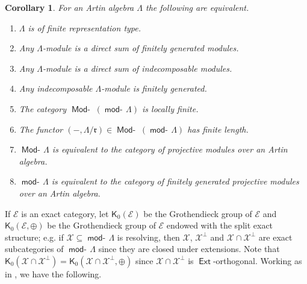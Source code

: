\documentclass[oneside, a4paper,reqno]{amsart}
\numberwithin{equation}{section}
\newtheorem{cor}[thm]{Corollary}
\theoremstyle{definition}
\begin{document}
\begin{cor} \cite{Auslander:large, Auslander:II, RT} For an Artin algebra $\Lambda$ the
following are equivalent.
\begin{enumerate}
\item $\Lambda$ is of finite representation type.
\item Any $\Lambda$-module is a direct sum of finitely generated
modules.
\item Any $\Lambda$-module is a direct sum of indecomposable
modules.
\item Any indecomposable $\Lambda$-module is finitely generated.
\item The category $\operatorname*{\mathsf{Mod}-\!}\,(\operatorname*{\mathsf{mod}-\!}\Lambda)$ is locally finite.
\item The functor $(-,\Lambda/\mathfrak{r}) \in \operatorname*{\mathsf{Mod}-\!}\,(\operatorname*{\mathsf{mod}-\!}\Lambda)$ has finite length.
\item $\operatorname*{\mathsf{Mod}-\!}\Lambda$ is equivalent to the category of projective modules over
an Artin algebra.
\item $\operatorname*{\mathsf{mod}-\!}\Lambda$ is equivalent to the category of finitely generated projective modules over
an Artin algebra.
\end{enumerate}
\end{cor}

If ${\mathscr E}$ is an exact category, let $\mathsf{K}_{0}({\mathscr E})$ be the
Grothendieck group of ${\mathscr E}$ and $\mathsf{K}_{0}({\mathscr E},\oplus)$ be the
Grothendieck group of ${\mathscr E}$ endowed with the split exact structure;
e.g. if ${\mathcal X} \subseteq \operatorname*{\mathsf{mod}-\!}\Lambda$ is resolving, then  ${\mathcal X}$,
${\mathcal X}^{\bot}$ and ${\mathcal X} \cap {\mathcal X}^{\bot}$ are exact subcategories of
$\operatorname*{\mathsf{mod}-\!}\Lambda$ since they are closed under extensions. Note that
$\mathsf{K}_{0}({\mathcal X}\cap {\mathcal X}^{\bot}) = \mathsf{K}_{0}({\mathcal X}\cap
{\mathcal X}^{\bot},\oplus)$ since ${\mathcal X}\cap {\mathcal X}^{\bot}$ is $\operatorname*{\mathsf{Ext}}$-orthogonal.
Working as in \cite[Theorem 8.9, Corollary 8.10]{B:cm}, we have the
following.
\end{document}
